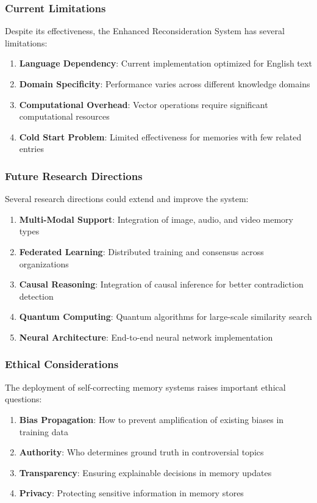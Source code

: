 \documentclass[12pt,a4paper]{article}
\begin{document}
\subsubsection{Current Limitations}

Despite its effectiveness, the Enhanced Reconsideration System has several limitations:

\begin{enumerate}
\item \textbf{Language Dependency}: Current implementation optimized for English text
\item \textbf{Domain Specificity}: Performance varies across different knowledge domains
\item \textbf{Computational Overhead}: Vector operations require significant computational resources
\item \textbf{Cold Start Problem}: Limited effectiveness for memories with few related entries
\end{enumerate}

\subsubsection{Future Research Directions}

Several research directions could extend and improve the system:

\begin{enumerate}
\item \textbf{Multi-Modal Support}: Integration of image, audio, and video memory types
\item \textbf{Federated Learning}: Distributed training and consensus across organizations
\item \textbf{Causal Reasoning}: Integration of causal inference for better contradiction detection
\item \textbf{Quantum Computing}: Quantum algorithms for large-scale similarity search
\item \textbf{Neural Architecture}: End-to-end neural network implementation
\end{enumerate}

\subsubsection{Ethical Considerations}

The deployment of self-correcting memory systems raises important ethical questions:

\begin{enumerate}
\item \textbf{Bias Propagation}: How to prevent amplification of existing biases in training data
\item \textbf{Authority}: Who determines ground truth in controversial topics
\item \textbf{Transparency}: Ensuring explainable decisions in memory updates
\item \textbf{Privacy}: Protecting sensitive information in memory stores
\end{enumerate}
\end{document}
